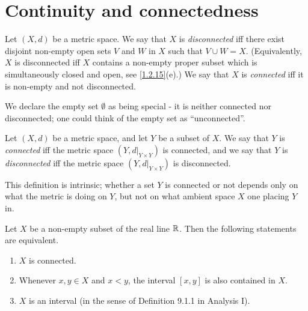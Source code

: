 \section{Continuity and connectedness}\label{sec:2.4}

\begin{defn}\label{2.4.1}
  Let \((X, d)\) be a metric space.
  We say that \(X\) is \emph{disconnected} iff there exist disjoint non-empty open sets \(V\) and \(W\) in \(X\) such that \(V \cup W = X\).
  (Equivalently, \(X\) is disconnected iff \(X\) contains a non-empty proper subset which is simultaneously closed and open, see \cref{1.2.15}(e).)
  We say that \(X\) is \emph{connected} iff it is non-empty and not disconnected.
\end{defn}

\begin{note}
  We declare the empty set \(\emptyset\) as being special
  - it is neither connected nor disconnected;
  one could think of the empty set as ``unconnected''.
\end{note}

\setcounter{thm}{2}
\begin{defn}\label{2.4.3}
  Let \((X, d)\) be a metric space, and let \(Y\) be a subset of \(X\).
  We say that \(Y\) is \emph{connected} iff the metric space \((Y, d|_{Y \times Y})\) is connected, and we say that \(Y\) is \emph{disconnected} iff the metric space \((Y, d|_{Y \times Y})\) is disconnected.
\end{defn}

\begin{rmk}\label{2.4.4}
  This definition is intrinsic;
  whether a set \(Y\) is connected or not depends only on what the metric is doing on \(Y\), but not on what ambient space \(X\) one placing \(Y\) in.
\end{rmk}

\begin{thm}\label{2.4.5}
  Let \(X\) be a non-empty subset of the real line \(\mathbb{R}\).
  Then the following statements are equivalent.
  \begin{enumerate}
    \item \(X\) is connected.
    \item Whenever \(x, y \in X\) and \(x < y\), the interval \([x, y]\) is also contained in \(X\).
    \item \(X\) is an interval (in the sense of Definition 9.1.1 in Analysis I).
  \end{enumerate}
\end{thm}

